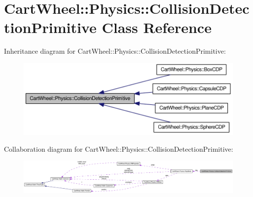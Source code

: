 \hypertarget{classCartWheel_1_1Physics_1_1CollisionDetectionPrimitive}{
\section{CartWheel::Physics::CollisionDetectionPrimitive Class Reference}
\label{classCartWheel_1_1Physics_1_1CollisionDetectionPrimitive}
}


Inheritance diagram for CartWheel::Physics::CollisionDetectionPrimitive:\nopagebreak
\begin{figure}[H]
\begin{center}
\leavevmode
\includegraphics[width=400pt]{classCartWheel_1_1Physics_1_1CollisionDetectionPrimitive__inherit__graph}
\end{center}
\end{figure}


Collaboration diagram for CartWheel::Physics::CollisionDetectionPrimitive:\nopagebreak
\begin{figure}[H]
\begin{center}
\leavevmode
\includegraphics[width=400pt]{classCartWheel_1_1Physics_1_1CollisionDetectionPrimitive__coll__graph}
\end{center}
\end{figure}
